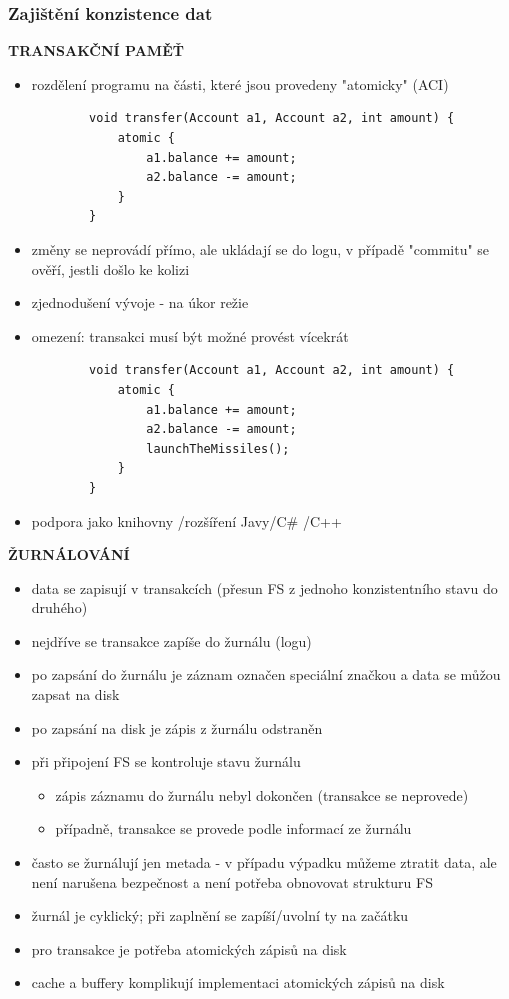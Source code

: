 \documentclass[10pt,a4paper]{article}
\begin{document}
\subsubsection{Zajištění konzistence dat}

\textbf{TRANSAKČNÍ PAMĚŤ}
\begin{itemize}
	\item rozdělení programu na části, které jsou provedeny "atomicky" (ACI)
	\begin{verbatim}
		void transfer(Account a1, Account a2, int amount) {
			atomic {
				a1.balance += amount;
				a2.balance -= amount;
			}
		}
	\end{verbatim}
	\item změny se neprovádí přímo, ale ukládají se do logu, v případě "commitu" se ověří, jestli došlo
ke kolizi
	\item zjednodušení vývoje - na úkor režie
	\item omezení: transakci musí být možné provést vícekrát
	\begin{verbatim}
		void transfer(Account a1, Account a2, int amount) {
			atomic {
				a1.balance += amount;
				a2.balance -= amount;
				launchTheMissiles();
			}
		}
	\end{verbatim}
	\item podpora jako knihovny /rozšíření Javy/C\# /C++
\end{itemize}

\textbf{ŽURNÁLOVÁNÍ}
\begin{itemize}
	\item data se zapisují v transakcích (přesun FS z jednoho konzistentního stavu do druhého)
	\item nejdříve se transakce zapíše do žurnálu (logu)
	\item po zapsání do žurnálu je záznam označen speciální značkou a data se můžou zapsat na disk
	\item po zapsání na disk je zápis z žurnálu odstraněn
	\item při připojení FS se kontroluje stavu žurnálu
	\begin{itemize}
		\item zápis záznamu do žurnálu nebyl dokončen (transakce se neprovede)
		\item případně, transakce se provede podle informací ze žurnálu
	\end{itemize}
	\item často se žurnálují jen metada - v případu výpadku můžeme ztratit data, ale není narušena
bezpečnost a není potřeba obnovovat strukturu FS
	\item žurnál je cyklický; při zaplnění se zapíší/uvolní ty na začátku
	\item pro transakce je potřeba atomických zápisů na disk
	\item cache a buffery komplikují implementaci atomických zápisů na disk
\end{itemize}
\end{document}
